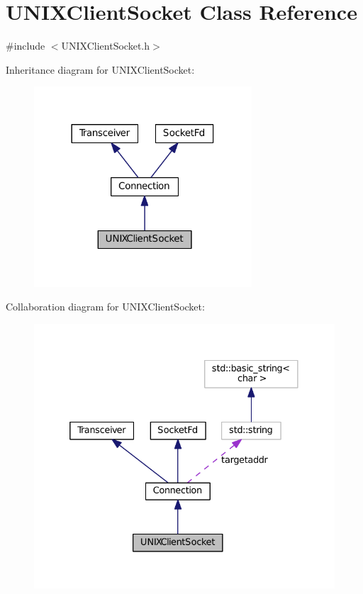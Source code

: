 \hypertarget{classUNIXClientSocket}{\section{U\+N\+I\+X\+Client\+Socket Class Reference}
\label{classUNIXClientSocket}
}


{\ttfamily \#include $<$U\+N\+I\+X\+Client\+Socket.\+h$>$}



Inheritance diagram for U\+N\+I\+X\+Client\+Socket\+:
\nopagebreak
\begin{figure}[H]
\begin{center}
\leavevmode
\includegraphics[width=230pt]{classUNIXClientSocket__inherit__graph}
\end{center}
\end{figure}


Collaboration diagram for U\+N\+I\+X\+Client\+Socket\+:
\nopagebreak
\begin{figure}[H]
\begin{center}
\leavevmode
\includegraphics[width=332pt]{classUNIXClientSocket__coll__graph}
\end{center}
\end{figure}
